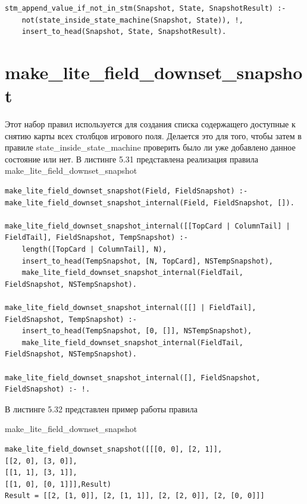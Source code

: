 \documentclass[12pt]{report}
\begin{document}
\begin{lstlisting}[label=some-code, caption=реализация правила stm\_append\_value\_if\_not\_in\_stm]
stm_append_value_if_not_in_stm(Snapshot, State, SnapshotResult) :-
	not(state_inside_state_machine(Snapshot, State)), !,
	insert_to_head(Snapshot, State, SnapshotResult).
\end{lstlisting}
\section{make\_lite\_field\_downset\_snapshot}
Этот набор правил используется для создания списка содержащего доступные к снятию карты всех столбцов игрового поля. Делается это для того, чтобы затем в правиле state\_inside\_state\_machine проверить было ли уже добавлено данное состояние или нет.
В листинге 5.31 представлена реализация правила
\newline
make\_lite\_field\_downset\_snapshot

\begin{lstlisting}[label=some-code, caption=реализация правила make\_lite\_field\_downset\_snapshot]
make_lite_field_downset_snapshot(Field, FieldSnapshot) :- make_lite_field_downset_snapshot_internal(Field, FieldSnapshot, []).

make_lite_field_downset_snapshot_internal([[TopCard | ColumnTail] | FieldTail], FieldSnapshot, TempSnapshot) :-
	length([TopCard | ColumnTail], N),
	insert_to_head(TempSnapshot, [N, TopCard], NSTempSnapshot),
	make_lite_field_downset_snapshot_internal(FieldTail, FieldSnapshot, NSTempSnapshot).

make_lite_field_downset_snapshot_internal([[] | FieldTail], FieldSnapshot, TempSnapshot) :-
	insert_to_head(TempSnapshot, [0, []], NSTempSnapshot),
	make_lite_field_downset_snapshot_internal(FieldTail, FieldSnapshot, NSTempSnapshot).

make_lite_field_downset_snapshot_internal([], FieldSnapshot, FieldSnapshot) :- !.

\end{lstlisting}

В листинге 5.32 представлен пример работы правила

make\_lite\_field\_downset\_snapshot

\begin{lstlisting}[label=some-code, caption=реализация правила make\_lite\_field\_downset\_snapshot]
make_lite_field_downset_snapshot([[[0, 0], [2, 1]],
[[2, 0], [3, 0]],
[[1, 1], [3, 1]],
[[1, 0], [0, 1]]],Result)
Result = [[2, [1, 0]], [2, [1, 1]], [2, [2, 0]], [2, [0, 0]]]
\end{lstlisting}
\end{document}
